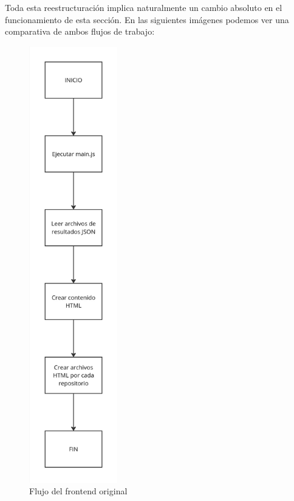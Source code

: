 \documentclass[a4paper, 12pt]{book}
\begin{document}
Toda esta reestructuración implica naturalmente un cambio absoluto en el funcionamiento de esta sección. En las siguientes imágenes podemos ver una comparativa de ambos flujos de trabajo:

\begin{figure}[H]
    \centering
    \includegraphics[height=19cm, keepaspectratio]{img/esquema_frontend_original.jpg}
    \caption{Flujo del frontend original}
    \label{fig:new_structure}
\end{figure}
\end{document}
